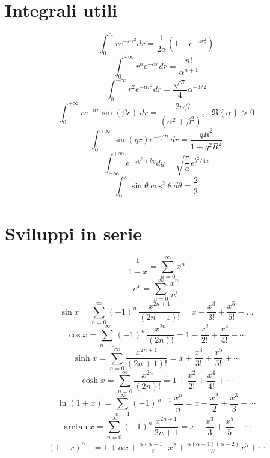 \documentclass[11pt, a4paper]{scrartcl} %
\numberwithin{equation}{section}
\theoremstyle{style2}
\theoremstyle{style1}
\begin{document}
\section{Integrali utili}
\begin{multicols}{2}
\begin{equation*}
	\int_{0} ^{r_*} r e^{-\alpha r^2} dr = \frac{1}{2\alpha } \left(1 - e^{-\alpha r_*^2 } \right) 
\end{equation*}
\begin{equation*}\label{solint1}
\int_{0} ^{+\infty} r^n e^{-\alpha r} dr = \frac{n!}{\alpha ^{n+1} }
\end{equation*}
\begin{equation*}
	\int_{0} ^{+\infty} r^2 e^{-\alpha r^2} dr = \frac{\sqrt{\pi} }{4} \alpha ^{-3 / 2} 
\end{equation*}
\begin{equation*}\label{solint3}
	\int_{0} ^{+\infty} r e^{- \alpha  r}  \sin (\beta r)\ dr = \frac{2 \alpha  \beta }{(\alpha ^2 + \beta ^2)^2}, \ \Re \left\{ \alpha  \right\} >0
\end{equation*}
\begin{equation*}\label{solint4}
	\int_{0} ^{+\infty} \sin(qr) e^{-r / R} \ dr = \frac{qR^2}{1 + q^2 R^2}
\end{equation*}
\begin{equation*}
	\label{solint5}
	\int_{-\infty} ^{+\infty} e^{-a y^2 + by}  dy = \sqrt{\frac{\pi}{a}} e^{b^2 / 4 a} 
\end{equation*}
\begin{equation*}\label{solint2}
	\int_{0} ^\pi \sin \theta \cos ^2 \theta  \ d\theta  = \frac{2}{3}
\end{equation*}
\end{multicols}
\section{Sviluppi in serie}
\begin{multicols}{2}
    \[
      \frac{1}{1 - x} = \sum_{n=0}^{\infty} x^n
    \]
    \[
      e^x = \sum_{n=0}^{\infty} \frac{x^n}{n!}
\]
    \[
      \sin x = \sum_{n=0}^{\infty} (-1)^n \,\frac{x^{2n+1}}{(2n+1)!}
      = x - \frac{x^3}{3!} +\frac{x^5}{5!} - \ldots
    \]
    \[
      \cos x = \sum_{n=0}^{\infty} (-1)^n \,\frac{x^{2n}}{(2n)!}
      = 1 -\frac{x^2}{2!} +\frac{x^4}{4!}-\cdots
    \]
    \[
      \sinh x = \sum_{n=0}^{\infty} \frac{x^{2n+1}}{(2n+1)!}
      = x +\frac{x^3}{3!} +\frac{x^5}{5!}+\cdots    \]
    \[
      \cosh x = \sum_{n=0}^{\infty} \frac{x^{2n}}{(2n)!}
      = 1 +\frac{x^2}{2!} +\frac{x^4}{4!}+\cdots    \]
    \[
      \ln(1 + x) = \sum_{n=1}^{\infty} (-1)^{\,n-1} \,\frac{x^n}{n}
      = x -\frac{x^2}{2} +\frac{x^3}{3} -\cdots    \]
    \[
      \arctan x = \sum_{n=0}^{\infty} (-1)^n\,\frac{x^{2n+1}}{2n+1} 
      = x -\frac{x^3}{3} +\frac{x^5}{5}-\cdots    
\]
    \[
	    \begin{split}
		    (1 + x)^\alpha &=1+\alpha x + \frac{\alpha(\alpha-1)}{2!}x^2 +\frac{\alpha(\alpha-1)(\alpha-2)}{3!}x^3 + \cdots
	    \end{split}
\]
\end{multicols}
\end{document}
